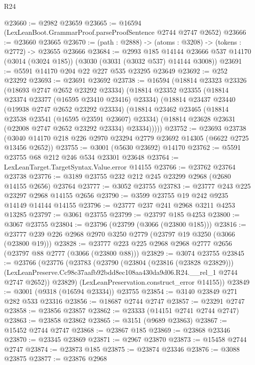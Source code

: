 \begin{lexlean}{R24}
\begin{coremodule}
@23660 := @2982 @23659
@23665 := @16594 (LexLeanBoot.GrammarProof.parseProofSentence @2744 @2747 @2652)
@23666 := @23660 @23665
@23670 := (path : @2888) -> (atoms : @3208) -> (tokens : @2772) -> @23655 @23666
@23684 := @2993
    @185
    @14144
    @23666
    @537
    @14170
    (@3014 (@3024 @185))
    (@3030 (@3031 (@3032 @537) @14144 @3008))
@23691 := @5591 @14170 @204 @22 @227 @535 @23295 @23649
@23692 := @252 @23292
@23693 := @23691 @23692
@23738 := @16594
    (@18814
      @23323
      @23326
      (@18693 @2747 @2652 @23292 @23334)
      (@18814
        @23352
        @23355
        (@18814 @23374 @23377 (@16595 @23410 @23416) @23334)
        (@18814
          @23437
          @23440
          (@19938 @2747 @2652 @23292 @23334)
          (@18814
            @23462
            @23465
            (@18814 @23538 @23541 (@16595 @23591 @23607) @23334)
            (@18814 @23628 @23631 (@22008 @2747 @2652 @23292 @23334) @23334)))))
@23752 := @23693
    @23738
    (@3040 @14170 @218 @226 @2970 @23294 @2779 @23692 @14305 (@6622 @2725 @13456 @2652))
@23755 := @3001 (@5630 @23692) @14170
@23762 := @5591 @23755 @68 @212 @246 @534 @23301 @23648
@23764 := LexLeanTarget.TargetSyntax.Value.error @14155
@23766 := @23762 @23764 @23738
@23776 := @3189 @23755 @232 @212 @245 @23299 @2968 (@2680 @14155 @2656) @23764
@23777 := @3052 @23755
@23783 := @23777 @243 @225 @23297 @2968 @14155 @2656
@23790 := @3599 @23755 @19 @242 @9235 @14149 @14144 @14155
@23796 := @23777 @237 @241 @2968 @3211 @4253 @13285
@23797 := @3061 @23755
@23799 := @23797 @185 @4253
@23800 := @3067 @23755
@23804 := @23796 (@23799 (@3066 (@23800 @185)))
@23816 := @23777 @239 @226 @2968 @2970 @3250 @2779 (@23797 @19 @3250 (@3066 (@23800 @19)))
@23828 := @23777 @223 @225 @2968 @2968 @2777 @2656 (@23797 @88 @2777 (@3066 (@23800 @88)))
@23829 := @3074 @23755
@23845 := @23766
    (@23776
      (@23783
        (@23790
          (@23804 (@23816 (@23828 @23829)))
          (LexLeanPreserve.Cc98c37aafb92bdd8ec108aa430da9d06.R24.__rel_1 @2744 @2747 @2652))
        @23829)
      (LexLeanPreservation.construct_error @14155))
@23849 := @3001 (@9318 (@16594 @23334)) @23755
@23854 := @3140 @23849 @271 @282 @533 @23316
@23856 := @18687 @2744 @2747
@23857 := @23291 @2747
@23858 := @23856 @23857
@23862 := @23333 (@14151 @2741 @2744 @2747)
@23863 := @23858 @23862
@23865 := @3151 (@9689 @23863)
@23867 := @15452 @2744 @2747
@23868 := @23867 @185
@23869 := @23868 @23346
@23870 := @23345 @23869
@23871 := @2967 @23870
@23873 := @15458 @2744 @2747
@23874 := @23873 @185
@23875 := @23874 @23346
@23876 := @3088 @23875
@23877 := @23876 @2968

\end{coremodule}
\end{lexlean}
